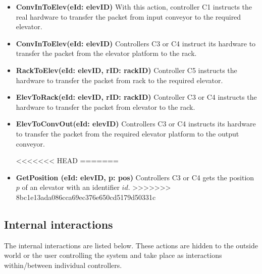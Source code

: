 \begin{itemize}
\item \textbf{ConvInToElev(eId: elevID)}
With this action, controller C1 instructs the real hardware to transfer the packet from input conveyor to the required elevator.

\item \textbf{ConvInToElev(eId: elevID)}
Controllers C3 or C4 instruct its hardware to transfer the packet from the elevator platform to the rack.

\item \textbf{RackToElev(eId: elevID, rID: rackID)}
Controller C5 instructs the hardware to transfer the packet from rack to the required elevator.

\item \textbf{ElevToRack(eId: elevID, rID: rackID)}
Controller C3 or C4 instructs the hardware to transfer the packet from elevator to the rack.

\item \textbf{ElevToConvOut(eId: elevID)}
Controllers C3 or C4 instructs its hardware to transfer the packet from the required elevator platform to the output conveyor.

<<<<<<< HEAD
=======
\item \textbf{GetPosition (eId: elevID, p: pos)}
Controllers C3 or C4 gets the position $p$ of an elevator with an identifier $id$.
>>>>>>> 8bc1e13ada086cca69ec376e650cd5179d50331c

\end{itemize}

\subsection*{Internal interactions}
The internal interactions are listed below. These actions are hidden to the outside world or the user controlling the system and take place as interactions within/between individual controllers.

